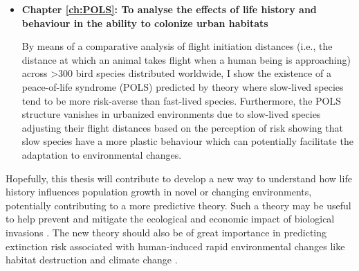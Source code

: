 \begin{itemize}
\item \textbf{Chapter \ref{ch:POLS}: To analyse the effects of life history and 
behaviour in the ability to colonize urban habitats}

By means of a comparative analysis of flight initiation distances (i.e., the
distance at which an animal takes flight when a human being is approaching)
across \textgreater{300} bird species distributed worldwide, I show the
existence of a peace-of-life syndrome (POLS) predicted by theory where
slow-lived species tend to be more risk-averse than fast-lived species.
Furthermore, the POLS structure vanishes in urbanized environments due to
slow-lived species adjusting their flight distances based on the perception of
risk showing that slow species have a more plastic behaviour which can
potentially facilitate the adaptation to environmental changes.
\end{itemize}

\bigskip


Hopefully, this thesis will contribute to develop a new way to understand how
life history influences population growth in novel or changing environments,
potentially contributing to a more predictive theory. Such a theory may be
useful to help prevent and mitigate the ecological and economic impact of
biological invasions \citep{Kolar2002, Vall-llosera2009, Leung2012}. The new
theory should also be of great importance in predicting extinction risk
associated with human-induced rapid environmental changes like habitat
destruction and climate change \citep{Saether2000, Sih2011}.
